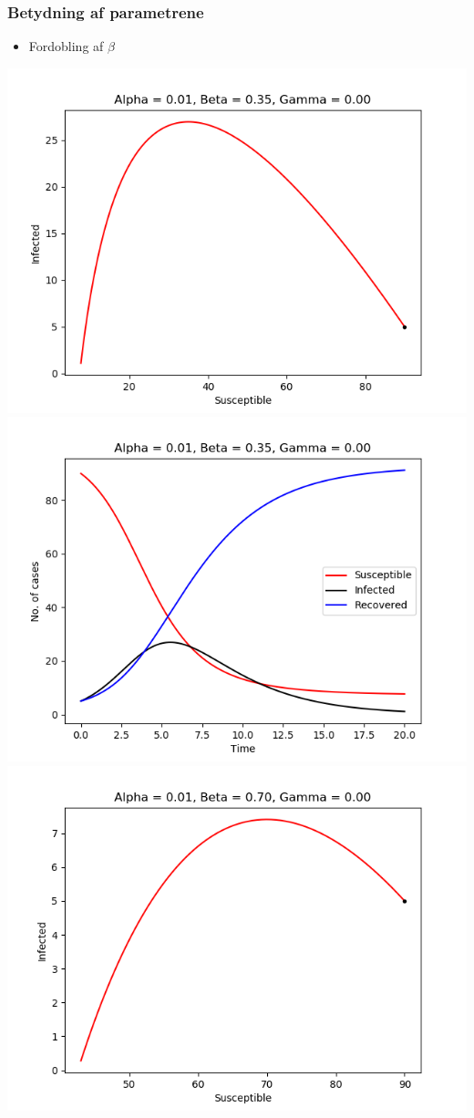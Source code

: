 \begin{frame}
\frametitle{Betydning af parametrene}
\begin{itemize}
\item Fordobling af $\beta$
\end{itemize}
\includegraphics[scale=0.295]{fig/img/a1_b35_g0.png}
\includegraphics[scale=0.295]{fig/img/t_a1_b35_g0.png}
%
\includegraphics[scale=0.295]{fig/img/a1_b7_g0.png}

\end{frame}
